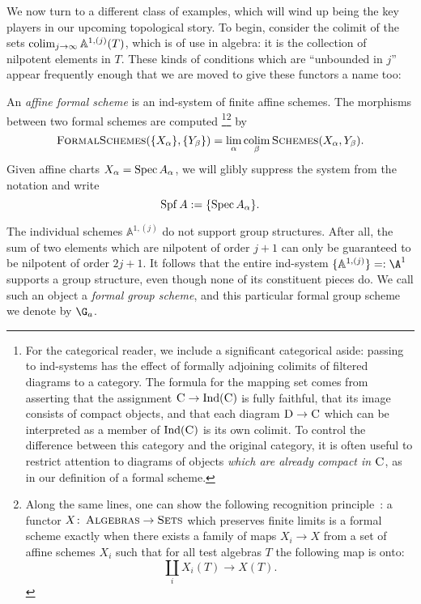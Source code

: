 We now turn to a different class of examples, which will wind up being the key players in our upcoming topological story.  To begin, consider the colimit of the sets \(\operatorname*{colim}_{j \to \infty} \mathbb A^{1,(j)}(T)\), which is of use in algebra: it is the collection of nilpotent elements in \(T\).  These kinds of conditions which are ``unbounded in \(j\)'' appear frequently enough that we are moved to give these functors a name too:
\begin{definition}
An \textit{affine formal scheme} is an ind-system of finite affine schemes.  The morphisms between two formal schemes are computed%
\footnote{For the categorical reader, we include a significant categorical aside: passing to ind-systems has the effect of formally adjoining colimits of filtered diagrams to a category.  The formula for the mapping set comes from asserting that the assignment \(\normalfont\textsc{C} \to \operatorname{Ind}(\normalfont\textsc{C})\) is fully faithful, that its image consists of compact objects, and that each diagram \(\normalfont\textsc{D} \to \normalfont\textsc{C}\) which can be interpreted as a member of \(\operatorname{Ind}(\normalfont\textsc{C})\) is its own colimit.  To control the difference between this category and the original category, it is often useful to restrict attention to diagrams of objects \emph{which are already compact in \(\normalfont\textsc{C}\)}, as in our definition of a formal scheme.}\footnote{Along the same lines, one can show the following recognition principle~\cite[Proposition 4.6]{StricklandFSFG}: a functor \(X\colon\thinspace \normalfont\textsc{Algebras} \to \normalfont\textsc{Sets}\) which preserves finite limits is a formal scheme exactly when there exists a family of maps \(X_i \to X\) from a set of affine schemes \(X_i\) such that for all test algebras \(T\) the following map is onto: \[\coprod_i X_i(T) \to X(T).\]}
by \[\normalfont\textsc{FormalSchemes}(\{X_\alpha\}, \{Y_\beta\}) = \lim_\alpha \operatorname*{colim}_\beta \normalfont\textsc{Schemes}(X_\alpha, Y_\beta).\]  Given affine charts \(X_\alpha = \operatorname{Spec} A_\alpha\), we will glibly suppress the system from the notation and write \[\operatorname{Spf} A := \{\operatorname{Spec} A_\alpha\}.\]
\end{definition}

\begin{example}\label{FormalGaExample}
The individual schemes \(\mathbb A^{1, (j)}\) do not support group structures.  After all, the sum of two elements which are nilpotent of order \(j+1\) can only be guaranteed to be nilpotent of order \(2j+1\).  It follows that the entire ind-system \(\{\mathbb A^{1, (j)}\} =: \A^1\) supports a group structure, even though none of its constituent pieces do.  We call such an object a \textit{formal group scheme}, and this particular formal group scheme we denote by \(\G_a\).
\end{example}

